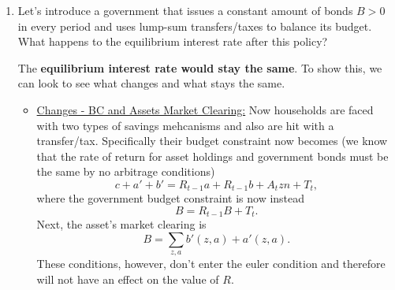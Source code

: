 \documentclass[11pt,english]{article}
\begin{document}
\begin{enumerate}[label = (\alph*)]
\begin{solution}
\begin{align*}
\end{align*}
We have now boiled down $R$ as an expression of $z$ and $A$ (note also that I have conjectured that $R$ is time invariant which I will later confirm). Then, using the hint, we know that households that have been hit with $z_L$ are borrowing constrained and therefore may not necessarily have a binding Euler condition (given that they may want to borrow more). On the other hand, individuals who have been hit with the high productivity shock are guaranteed to have a binding Euler condition (no matter their previous asset holdings) by the asset market clearing condition. As such, we can then continue to write
\begin{align*}
\frac{1}{R'} &= \beta Az\left(\frac{\pi_z\pi_A}{A_Hz_H} + \frac{\pi_z(1-\pi_A)}{A_Lz_H} + \frac{(1-\pi_z)\pi_A}{A_Hz_L} + \frac{(1-\pi_z)(1-\pi_A)}{A_Lz_L}\right),\\
\implies \frac{1}{R'} &= \beta Az_H\left(\frac{\pi_z\pi_A}{A_Hz_H} + \frac{\pi_z(1-\pi_A)}{A_Lz_H} + \frac{(1-\pi_z)\pi_A}{A_Hz_L} + \frac{(1-\pi_z)(1-\pi_A)}{A_Lz_L}\right),\\
\implies R' &= \frac{1}{\beta A z_H}\left(\frac{\pi_z\pi_A}{A_Hz_H} + \frac{\pi_z(1-\pi_A)}{A_Lz_H} + \frac{(1-\pi_z)\pi_A}{A_Hz_L} + \frac{(1-\pi_z)(1-\pi_A)}{A_Lz_L}\right)^{-1}.
\end{align*} Since this expression is independent of time period (which confirms the conjecture), we can write  $$\boxed{R(A) = \frac{1}{\beta A z_H}\left(\frac{\pi_z\pi_A}{A_Hz_H} + \frac{\pi_z(1-\pi_A)}{A_Lz_H} + \frac{(1-\pi_z)\pi_A}{A_Hz_L} + \frac{(1-\pi_z)(1-\pi_A)}{A_Lz_L}\right)^{-1}.}$$
\end{solution}
  \item Let's introduce a government that issues a constant amount of bonds
    $B > 0$ in every period and uses lump-sum transfers/taxes to balance its
    budget. What happens to the equilibrium interest rate after this policy?
  \begin{solution}
The \textbf{equilibrium interest rate would stay the same}. To show this, we can look to see what changes and what stays the same.
\begin{itemize}
\item \underline{Changes - BC and Assets Market Clearing:} Now households are faced with two types of savings mehcanisms and also are hit with a transfer/tax. Specifically their budget constraint now becomes (we know that the rate of return for asset holdings and government bonds must be the same by no arbitrage conditions) $$c + a' + b' = R_{t-1}a + R_{t-1}b + A_tzn + T_t,$$where the government budget constraint is now instead $$B = R_{t-1}B + T_t.$$ Next, the asset's market clearing is $$B = \sum_{z, a} b'(z,a) + a'(z,a).$$ These conditions, however, don't enter the euler condition and therefore will not have an effect on the value of $R$.

\end{itemize}
\end{solution}
\end{enumerate}
\end{document}
